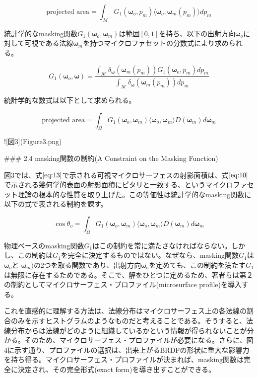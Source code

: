 \[
\text{projected area} = \int_\mathcal{M} G_1(\boldsymbol{\omega}_o, p_m) \langle \boldsymbol{\omega}_o, \boldsymbol{\omega}_m(p_m) \rangle dp_m
\label{eq:11} \tag{11}
\]

統計学的なmasking関数$G_1(\boldsymbol{\omega}_o, \boldsymbol{\omega}_m)$は範囲$[0, 1]$を持ち、以下の出射方向$\boldsymbol{\omega}_o$に対して可視である法線$\boldsymbol{\omega}_m$を持つマイクロファセットの分数式により求められる。

\[
G_1(\boldsymbol{\omega}_o, \boldsymbol{\omega}) = \frac{\int_\mathcal{M}\delta_\boldsymbol{\omega}(\boldsymbol{\omega}_m(p_m))G_1(\boldsymbol{\omega}_o, p_m)dp_m}{\int_\mathcal{M}\delta_\boldsymbol{\omega}(\boldsymbol{\omega}_m(p_m))dp_m}
\label{eq:12} \tag{12}
\]

統計学的な数式は以下として求められる。

\[
\text{projected area} = \int_\Omega G_1(\boldsymbol{\omega}_o, \boldsymbol{\omega}_m) \langle \boldsymbol{\omega}_o, \boldsymbol{\omega}_m \rangle D(\boldsymbol{\omega}_m) d\boldsymbol{\omega}_m
\label{eq:13} \tag{13}
\]

![図3](Figure3.png)

### 2.4 masking関数の制約(A Constraint on the Masking Function)

図3では、式$\eqref{eq:13}$で示される可視マイクロサーフェスの射影面積は、式$\eqref{eq:10}$で示される幾何学的表面の射影面積にピタリと一致する、というマイクロファセット理論の根本的な性質を取り上げた。この等価性は統計学的なmasking関数に以下の式で表される制約を課す。

\[
\cos \theta_o = \int_\Omega G_1(\boldsymbol{\omega}_o, \boldsymbol{\omega}_m) \langle \boldsymbol{\omega}_o, \boldsymbol{\omega}_m \rangle D(\boldsymbol{\omega}_m) d\boldsymbol{\omega}_m
\label{eq:14} \tag{14}
\]

物理ベースのmasking関数$G_1$はこの制約を常に満たさなければならない。しかし、この制約は$G_1$を完全に決定するものではない。なぜなら、masking関数$G_1$は$\boldsymbol{\omega}_o$と $\boldsymbol{\omega}_m)$の2つを取る関数であり、出射方向$\boldsymbol{\omega}_o$を定めても、この制約を満たす$G_1$は無限に存在するためである。そこで、解をひとつに定めるため、著者らは第２の制約としてマイクロサーフェス・プロファイル(microsurface profile)を導入する。

これを直感的に理解する方法は、法線分布はマイクロサーフェス上の各法線の割合のみを示すヒストグラムのようなものだと考えることである。そうすると、法線分布からは法線がどのように組織しているかという情報が得られないことが分かる。そのため、マイクロサーフェス・プロファイルが必要になる。さらに、図4に示す通り、プロファイルの選択は、出来上がるBRDFの形状に重大な影響力を持ち得る。マイクロサーフェス・プロファイルが決まれば、masking関数は完全に決定され、その完全形式(exact form)を導き出すことができる。

